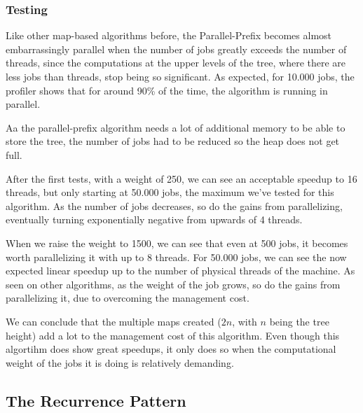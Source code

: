 \documentclass[10pt,journal]{IEEEtran}
\begin{document}
\subsubsection{Testing}

Like other map-based algorithms before, the Parallel-Prefix becomes almost embarrassingly parallel when the number of jobs greatly exceeds the number of threads, since the computations at the upper levels of the tree, where there are less jobs than threads, stop being so significant. As expected, for 10.000 jobs, the profiler shows that for around 90\% of the time, the algorithm is running in parallel.

Aa the parallel-prefix algorithm needs a lot of additional memory to be able to store the tree, the number of jobs had to be reduced so the heap does not get full. 

After the first tests, with a weight of 250, we can see an acceptable speedup to 16 threads, but only starting at 50.000 jobs, the maximum we've tested for this algorithm.  As the number of jobs decreases, so do the gains from parallelizing, eventually turning exponentially negative from upwards of 4 threads.

When we raise the weight to 1500, we can see that even at 500 jobs, it becomes worth parallelizing it with up to 8 threads. For 50.000 jobs, we can see the now expected linear speedup up to the number of physical threads of the machine. As seen on other algorithms, as the weight of the job grows, so do the gains from parallelizing it, due to overcoming the management cost.

We can conclude that the multiple maps created ($ 2n $, with $ n $ being the tree height) add a lot to the management cost of this algorithm. Even though this algortihm does show great speedups, it only does so when the computational weight of the jobs it is doing is relatively demanding.

\subsection{The Recurrence Pattern}
\end{document}
